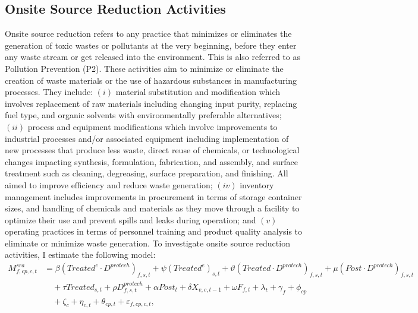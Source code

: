 \documentclass[12pt, english]{article}
\begin{document}
    \subsection{Onsite Source Reduction Activities}\label{subsec:onsite-source-reduction-activities}
    Onsite source reduction refers to any practice that minimizes or eliminates the generation of toxic wastes or pollutants at the very beginning, before they enter any waste stream or get released into the environment. This is also referred to as Pollution Prevention (P2). These activities aim to minimize or eliminate the creation of waste materials or the use of hazardous substances in manufacturing processes. They include: $(i)$ material substitution and modification which involves replacement of raw materials including changing input purity, replacing fuel type, and organic solvents with environmentally preferable alternatives; $(ii)$ process and equipment modifications which involve improvements to industrial processes and/or associated equipment including implementation of new processes that produce less waste, direct reuse of chemicals, or technological changes impacting synthesis, formulation, fabrication, and assembly, and surface treatment such as cleaning, degreasing, surface preparation, and finishing. All aimed to improve efficiency and reduce waste generation; $(iv)$ inventory management includes improvements in procurement in terms of storage container sizes, and handling of chemicals and materials as they move through a facility to optimize their use and prevent spills and leaks during operation; and $(v)$ operating practices in terms of personnel training and product quality analysis to eliminate or minimize waste generation. To investigate onsite source reduction activities, I estimate the following model:
    \begin{align}
        M_{f,cp,c,t}^{sra} &= \beta (Treated^{e} \cdot D^{protech})_{f,s,t} + \psi (Treated^{e})_{s,t} + \vartheta (Treated \cdot D^{protech})_{f,s,t} + \mu (Post \cdot D^{protech})_{f,s,t} \nonumber \\
        &\quad + \tau Treated_{s,t} + \rho D_{f,s,t}^{protech} + \alpha Post_{t} + \delta X_{v,c,t-1} + \omega F_{f,t} + \lambda_{t} + \gamma_{f} + \phi_{cp} \nonumber \\
        &\quad + \zeta_{c} + \eta_{c,t} + \theta_{cp,t} + \varepsilon_{f,cp,c,t},\label{eq:mechanisms-source-reduction}
    \end{align}
\end{document}
